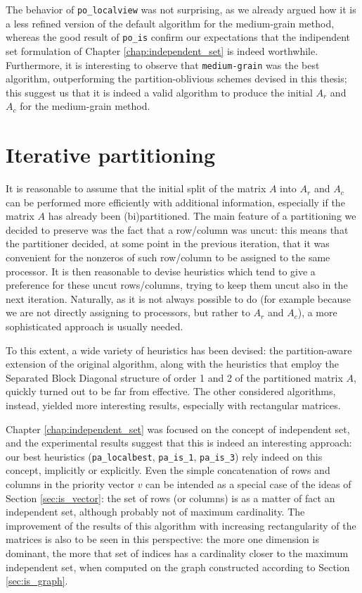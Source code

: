 The behavior of \verb|po_localview| was not surprising, as we already argued how it is a less refined version of the default algorithm for the medium-grain method, whereas the good result of \verb|po_is| confirm our expectations that the indipendent set formulation of Chapter \ref{chap:independent_set} is indeed worthwhile. Furthermore, it is interesting to observe that \verb|medium-grain| was the best algorithm, outperforming the partition-oblivious schemes devised in this thesis; this suggest us that it is indeed a valid algorithm to produce the initial $A_r$ and $A_c$ for the medium-grain method.

\section{Iterative partitioning} \label{sec:conclusions_pa}

It is reasonable to assume that the initial split of the matrix $A$ into $A_r$ and $A_c$ can be performed more efficiently with additional information, especially if the matrix $A$ has already been (bi)partitioned. The main feature of a partitioning we decided to preserve was the fact that a row/column was uncut: this means that the partitioner decided, at some point in the previous iteration, that it was convenient for the nonzeros of such row/column to be assigned to the same processor. It is then reasonable to devise heuristics which tend to give a preference for these uncut rows/columns, trying to keep them uncut also in the next iteration. Naturally, as it is not always possible to do (for example because we are not directly assigning to processors, but rather to $A_r$ and $A_c$), a more sophisticated approach is usually needed.

To this extent, a wide variety of heuristics has been devised: the partition-aware extension of the original algorithm, along with the heuristics that employ the Separated Block Diagonal structure of order 1 and 2 of the partitioned matrix $A$, quickly turned out to be far from effective. The other considered algorithms, instead, yielded more interesting results, especially with rectangular matrices.

Chapter \ref{chap:independent_set} was focused on the concept of independent set, and the experimental results suggest that this is indeed an interesting approach: our best heuristics (\verb|pa_localbest|, \verb|pa_is_1|, \verb|pa_is_3|) rely indeed on this concept, implicitly or explicitly. Even the simple concatenation of rows and columns in the priority vector $v$ can be intended as a special case of the ideas of Section \ref{sec:is_vector}: the set of rows (or columns) is as a matter of fact an independent set, although probably not of maximum cardinality. The improvement of the results of this algorithm with increasing rectangularity of the matrices is also to be seen in this perspective: the more one dimension is dominant, the more that set of indices has a cardinality closer to the maximum independent set, when computed on the graph constructed according to Section \ref{sec:is_graph}.

